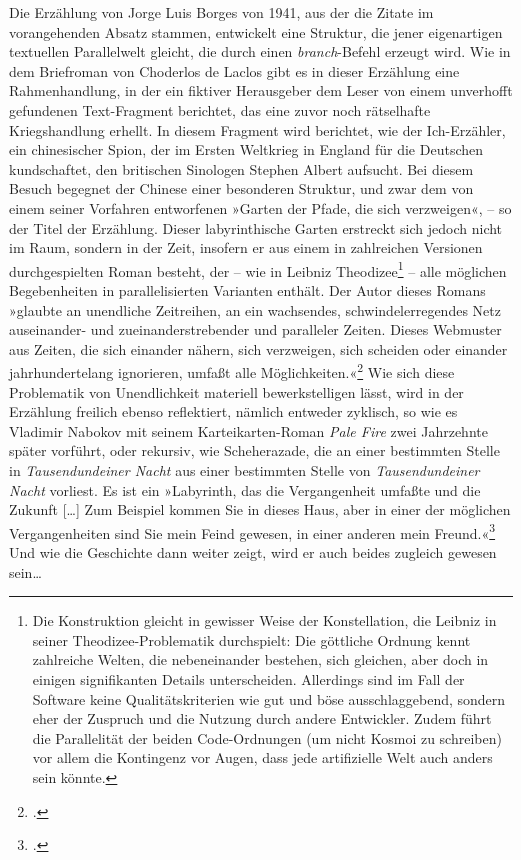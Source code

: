 \documentclass[a4paper,12pt]{article}
\newcommand{\anf}[1]{»#1«}
\begin{document}
Die Erzählung von Jorge Luis Borges von 1941, aus der die Zitate im vorangehenden Absatz stammen, entwickelt eine Struktur, die jener eigenartigen textuellen Parallelwelt gleicht, die durch einen \emph{branch}-Befehl erzeugt wird. Wie in dem Briefroman von Choderlos de Laclos gibt es in dieser Erzählung eine Rahmenhandlung, in der ein fiktiver Herausgeber dem Leser von einem unverhofft gefundenen Text-Fragment berichtet, das eine zuvor noch rätselhafte Kriegshandlung erhellt. In diesem Fragment wird berichtet, wie der Ich-Erzähler, ein chinesischer Spion, der im Ersten Weltkrieg in England für die Deutschen kundschaftet, den britischen Sinologen Stephen Albert aufsucht. Bei diesem Besuch begegnet der Chinese einer besonderen Struktur, und zwar dem von einem seiner Vorfahren entworfenen \anf{Garten der Pfade, die sich verzweigen}, – so der Titel der Erzählung. Dieser labyrinthische Garten erstreckt sich jedoch nicht im Raum, sondern in der Zeit, insofern er aus einem in zahlreichen Versionen durchgespielten Roman besteht, der – wie in Leibniz Theodizee\footnote{Die Konstruktion gleicht in gewisser Weise der Konstellation, die Leibniz in seiner Theodizee-Problematik durchspielt: Die göttliche Ordnung kennt zahlreiche Welten, die nebeneinander bestehen, sich gleichen, aber doch in einigen signifikanten Details unterscheiden. Allerdings sind im Fall der Software keine Qualitätskriterien wie gut und böse ausschlaggebend, sondern eher der Zuspruch und die Nutzung durch andere Entwickler. Zudem führt die Parallelität der beiden Code-Ordnungen (um nicht Kosmoi zu schreiben) vor allem die Kontingenz vor Augen, dass jede artifizielle Welt auch anders sein könnte.} – alle möglichen Begebenheiten in parallelisierten Varianten enthält. Der Autor dieses Romans \anf{glaubte an unendliche Zeitreihen, an ein wachsendes, schwindelerregendes Netz auseinander- und zueinanderstrebender und paralleler Zeiten. Dieses Webmuster aus Zeiten, die sich einander nähern, sich verzweigen, sich scheiden oder einander jahrhundertelang ignorieren, umfaßt alle Möglichkeiten.}\footcite[172]{borges:1941} Wie sich diese Problematik von Unendlichkeit materiell bewerkstelligen lässt, wird in der Erzählung freilich ebenso reflektiert, nämlich entweder zyklisch, so wie es Vladimir Nabokov mit seinem Karteikarten-Roman \emph{Pale Fire} zwei Jahrzehnte später vorführt, oder rekursiv, wie Scheherazade, die an einer bestimmten Stelle in \emph{Tausendundeiner Nacht} aus einer bestimmten Stelle von \emph{Tausendundeiner Nacht} vorliest. Es ist ein \anf{Labyrinth, das die Vergangenheit umfaßte und die Zukunft [\ldots] Zum Beispiel kommen Sie in dieses Haus, aber in einer der möglichen Vergangenheiten sind Sie mein Feind gewesen, in einer anderen mein Freund.}\footcite[166/170]{borges:1941} Und wie die Geschichte dann weiter zeigt, wird er auch beides zugleich gewesen sein\ldots %
\end{document}
